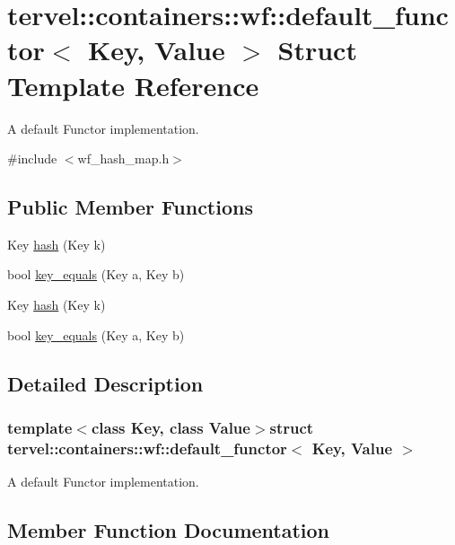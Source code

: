 \hypertarget{structtervel_1_1containers_1_1wf_1_1default__functor}{}\section{tervel\+:\+:containers\+:\+:wf\+:\+:default\+\_\+functor$<$ Key, Value $>$ Struct Template Reference}
\label{structtervel_1_1containers_1_1wf_1_1default__functor}


A default Functor implementation.  




{\ttfamily \#include $<$wf\+\_\+hash\+\_\+map.\+h$>$}

\subsection*{Public Member Functions}
\begin{DoxyCompactItemize}
\item 
Key \hyperlink{structtervel_1_1containers_1_1wf_1_1default__functor_ad185cd085c0b61b6b82bd0faf9eda7ae}{hash} (Key k)
\item 
bool \hyperlink{structtervel_1_1containers_1_1wf_1_1default__functor_a7956a13bdb3ba082ac5e50800000254f}{key\+\_\+equals} (Key a, Key b)
\item 
Key \hyperlink{structtervel_1_1containers_1_1wf_1_1default__functor_ad185cd085c0b61b6b82bd0faf9eda7ae}{hash} (Key k)
\item 
bool \hyperlink{structtervel_1_1containers_1_1wf_1_1default__functor_a7956a13bdb3ba082ac5e50800000254f}{key\+\_\+equals} (Key a, Key b)
\end{DoxyCompactItemize}


\subsection{Detailed Description}
\subsubsection*{template$<$class Key, class Value$>$struct tervel\+::containers\+::wf\+::default\+\_\+functor$<$ Key, Value $>$}

A default Functor implementation. 



\subsection{Member Function Documentation}
\hypertarget{structtervel_1_1containers_1_1wf_1_1default__functor_ad185cd085c0b61b6b82bd0faf9eda7ae}{}
